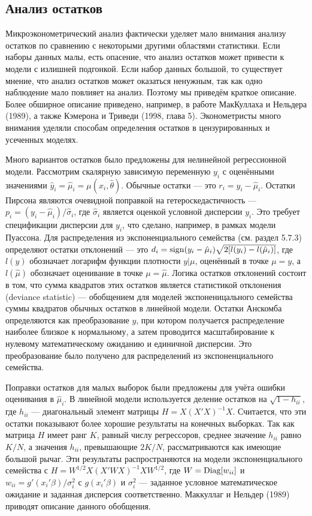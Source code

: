 \subsection{Анализ остатков}

Микроэконометрический анализ фактически уделяет мало внимания анализу остатков по сравнению с некоторыми другими областями статистики. Если наборы данных малы, есть опасение, что анализ остатков может привести к модели с излишней подгонкой. Если набор данных большой, то существует мнение, что анализ остатков может оказаться ненужным, так как одно наблюдение мало повлияет на анализ. Поэтому мы приведём краткое описание. Более обширное описание приведено, например, в работе МакКуллаха и Нельдера (1989), а также Кэмерона и Триведи (1998, глава 5). Эконометристы много внимания уделяли способам  определения остатков в цензурированных и усеченных моделях.

Много вариантов остатков было предложены для нелинейной регрессионной модели. Рассмотрим скалярную зависимую переменную $y_i$ с оценёнными значениями $\hat{y}_i = \hat{\mu}_i = \mu(x_i, \hat{\theta})$. Обычные остатки --- это $r_i = y_i - \hat{\mu}_i$. Остатки Пирсона являются очевидной поправкой на гетероскедастичность --- $p_i = (y_i - \hat{\mu}_i)/\hat{\sigma}_i$, где $\hat{\sigma}_i$ является оценкой условной дисперсии $y_i$. Это требует  спецификации дисперсии для $y_i$, что сделано, например, в рамках модели Пуассона. Для распределения из экспоненциального семейства (см. раздел 5.7.3) определяют остатки отклонений --- это $d_i = \mathrm{sign}(y_i - \hat{\mu}_i)\sqrt{2[l(y_i) - l(\hat{\mu}_i)]}$, где $l(y)$ обозначает логарифм функции плотности $y|\mu$, оценённый в точке $\mu = y$, а $l(\hat{\mu})$ обозначает оценивание в точке $\mu = \hat{\mu}$. Логика остатков отклонений состоит в том, что сумма квадратов этих остатков является статистикой отклонения (deviance statistic) --- обобщением для моделей экспоненицального семейства суммы квадратов обычных остатков в линейной модели. Остатки Анскомба определяются как преобразование $y$, при котором получается распределение наиболее близкое к нормальному, а затем проводится масштабирование к нулевому математическому ожиданию и единичной дисперсии. Это преобразование было получено для распределений из экспоненциального семейства.

Поправки остатков для малых выборок были предложены для учёта ошибки оценивания в $\hat{\mu}_i$. В линейной модели используется деление остатков на $\sqrt{1 - h_{ii}}$, где $h_{ii}$ --- диагональный элемент матрицы $H = X(X'X)^{-1}X$. Считается, что эти остатки показывают более хорошие результаты на конечных выборках. Так как матрица $H$ имеет ранг $K$, равный числу регрессоров, среднее значение $h_{ii}$ равно $K/N$, а значения $h_{ii}$, превышающие $2K/N$, рассматриваются как имеющие большой рычаг. Эти результаты распространяются на модели экспоненциального семейства с $H = W^{1/2}X(X'WX)^{-1}XW^{1/2}$, где $W = \mathrm{Diag}[w_{ii}]$ и $w_{ii} = g'(x_i'\beta)/\sigma_i^2$ с $g(x_i'\beta)$ и $\sigma_i^2$ --- заданное условное математическое ожидание и заданная дисперсия соответственно. Маккуллаг и Нельдер (1989) приводят описание данного обобщения.

